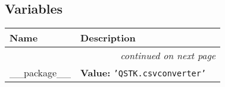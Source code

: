 
  \subsection{Variables}

    \vspace{-1cm}
\hspace{\varindent}\begin{longtable}{|p{\varnamewidth}|p{\vardescrwidth}|l}
\cline{1-2}
\cline{1-2} \centering \textbf{Name} & \centering \textbf{Description}& \\
\cline{1-2}
\endhead\cline{1-2}\multicolumn{3}{r}{\small\textit{continued on next page}}\\\endfoot\cline{1-2}
\endlastfoot\raggedright \_\-\_\-p\-a\-c\-k\-a\-g\-e\-\_\-\_\- & \raggedright \textbf{Value:} 
{\tt \texttt{'}\texttt{QSTK.csvconverter}\texttt{'}}&\\
\cline{1-2}
\end{longtable}

